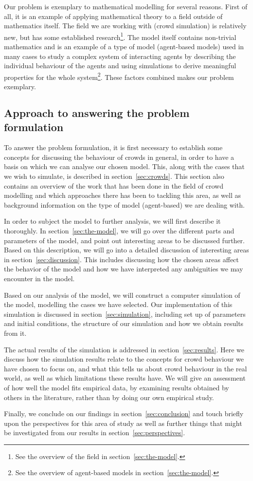 Our problem is exemplary to mathematical modelling for several reasons. First 
of all, it is an example of applying mathematical theory to a field outside of 
mathematics itself. The field we are working with (crowd simulation) is 
relatively new, but has some established research\footnote{See the overview of 
the field in section~\ref{sec:the-model}.}. The model itself contains 
non-trivial mathematics and is an example of a type of model (agent-based 
models) used in many cases to study a complex system of interacting agents by 
describing the individual behaviour of the agents and using simulations to 
derive meaningful properties for the whole system\footnote{See the overview of 
agent-based models in section~\ref{sec:the-model}.}. These factors combined 
makes our problem exemplary.

\subsection{Approach to answering the problem formulation}
To answer the problem formulation, it is first necessary to establish some 
concepts for discussing the behaviour of crowds in general, in order to have a 
basis on which we can analyse our chosen model. This, along with the cases 
that we wish to simulate, is described in section~\ref{sec:crowds}. This 
section also contains an overview of the work that has been done in the field 
of crowd modelling and which approaches there has been to tackling this area, 
as well as background information on the type of model (agent-based) we are 
dealing with.

In order to subject the model to further analysis, we will first describe it 
thoroughly. In section~\ref{sec:the-model}, we will go over the different 
parts and parameters of the model, and point out interesting areas to be 
discussed further.  Based on this description, we will go into a detailed 
discussion of interesting areas in section~\ref{sec:discussion}.
This includes discussing how the chosen areas affect the behavior of the model and 
how we have interpreted any ambiguities we may encounter in the model.

Based on our analysis of the model, we will construct a computer simulation of 
the model, modelling the cases we have selected. Our implementation of this 
simulation is discussed in section~\ref{sec:simulation}, including set up of 
parameters and initial conditions, the structure of our simulation and how we 
obtain results from it.

The actual results of the simulation is addressed in 
section~\ref{sec:results}. Here we discuss how the simulation results relate 
to the concepts for crowd behaviour we have chosen to focus on, and what this 
tells us about crowd behaviour in the real world, as well as which limitations 
these results have.  We will give an assessment of how well the model fits 
empirical data, by examining results obtained by others in the literature, 
rather than by doing our own empirical study.

Finally, we conclude on our findings in section~\ref{sec:conclusion} and touch 
briefly upon the perspectives for this area of study as well as further things 
that might be investigated from our results in section~\ref{sec:perspectives}.
